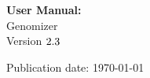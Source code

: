 
	\begin{titlepage}
		\thispagestyle{empty}
		
		\vspace*{45mm}
		\begin{center}
			\Huge{\textbf{User Manual:}\\ Genomizer} \\
			\LARGE{Version $2.3$} \\
           \vspace{10mm}
           
            Publication date: \today \\
            

			\vspace{70mm}
            
			\begin{normalsize}				
			\end{normalsize}
		\end{center}
	\end{titlepage}
